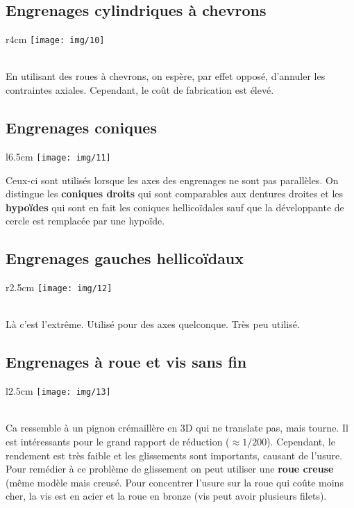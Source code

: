 \subsection{Engrenages cylindriques à chevrons}
	\begin{wrapfigure}[4]{r}{4cm}
	\texttt{[image: img/10]}
	\end{wrapfigure}	
	\ \\ En utilisant des roues à chevrons, on espère, par effet opposé, d'annuler les contraintes axiales. Cependant, le coût de fabrication est élevé. 
	
\subsection{Engrenages coniques}
	\begin{wrapfigure}[6]{l}{6.5cm}
	\texttt{[image: img/11]}
	\end{wrapfigure}	
	\noindent Ceux-ci sont utilisés lorsque les axes des engrenages ne sont pas parallèles. On distingue les \textbf{coniques droits} qui sont comparables aux dentures droites et les \textbf{hypoïdes} qui sont en fait les coniques hellicoïdales sauf que la développante de cercle est remplacée par une hypoïde.
	
\subsection{Engrenages gauches hellicoïdaux}
	\begin{wrapfigure}[2]{r}{2.5cm}
	\texttt{[image: img/12]}
	\end{wrapfigure}	
	\ \\ Là c'est l'extrême. Utilisé pour des axes quelconque. Très peu utilisé. \\
	
\subsection{Engrenages à roue et vis sans fin}
	\begin{wrapfigure}[7]{l}{2.5cm}
	\texttt{[image: img/13]}
	\end{wrapfigure}	
	\ \\ Ca ressemble à un pignon crémaillère en 3D qui ne translate pas, mais tourne. Il est intéressants pour le grand rapport de réduction ($\approx 1/200$). Cependant, le rendement est très faible et les glissements sont importants, causant de l'usure. Pour remédier à ce problème de glissement on peut utiliser une \textbf{roue creuse} (même modèle mais creusé. Pour concentrer l'usure sur la roue qui coûte moins cher, la vis est en acier et la roue en bronze (vis peut avoir plusieurs filets).
	
